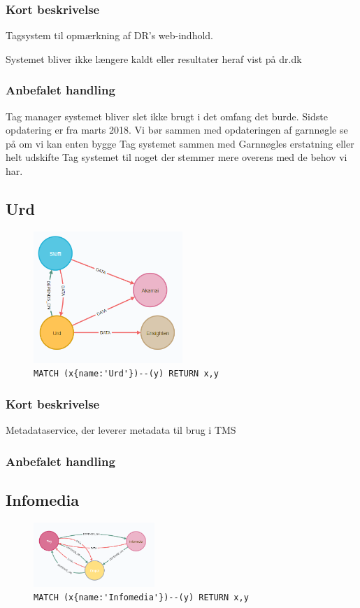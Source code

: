 \documentclass{article}
\begin{document}
\subsubsection*{Kort beskrivelse}
Tagsystem til opmærkning af DR's web-indhold.

Systemet bliver ikke længere kaldt eller resultater heraf vist på dr.dk
\subsubsection*{Anbefalet handling}
Tag manager systemet bliver slet ikke brugt i det omfang det burde. Sidste opdatering er fra marts 2018. Vi bør sammen med opdateringen af garnnøgle se på om vi kan enten bygge Tag systemet sammen med Garnnøgles erstatning eller helt udskifte Tag systemet til noget der stemmer mere overens med de behov vi har.



\subsection{Urd}
\begin{figure}[H]
\includegraphics[width=160pt]{Urd.PNG}
\cprotect\caption{\verb|MATCH (x{name:'Urd'})--(y) RETURN x,y|}
\end{figure}
\subsubsection*{Kort beskrivelse}
Metadataservice, der leverer metadata til brug i TMS
\subsubsection*{Anbefalet handling}



\subsection{Infomedia}
\begin{figure}[H]
\includegraphics[width=130pt]{Infomedia.PNG}
\cprotect\caption{\verb|MATCH (x{name:'Infomedia'})--(y) RETURN x,y|}
\end{figure}
\end{document}

